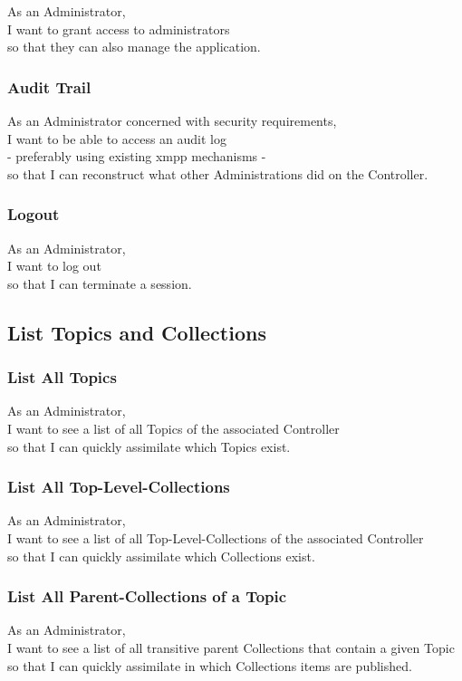 As an Administrator,\\
I want to grant access to administrators \\
so that they can also manage the application.

\subsubsection{Audit Trail}\label{sec:requirement-audit-trail}

As an Administrator concerned with security requirements,\\
I want to be able to access an audit log\\
- preferably using existing \gls{xmpp} mechanisms - \\
so that I can reconstruct what other Administrations did on the Controller.

\subsubsection{Logout}

As an Administrator,\\
I want to log out\\
so that I can terminate a session.

\subsection{List Topics and Collections}

\subsubsection{List All Topics}
As an Administrator,\\
I want to see a list of all Topics of the associated Controller\\
so that I can quickly assimilate which Topics exist.

\subsubsection{List All Top-Level-Collections}
As an Administrator,\\
I want to see a list of all Top-Level-Collections of the associated Controller\\
so that I can quickly assimilate which Collections exist.

\subsubsection{List All Parent-Collections of a Topic}
As an Administrator,\\
I want to see a list of all transitive parent Collections that contain a given Topic\\
so that I can quickly assimilate in which Collections items are published.

